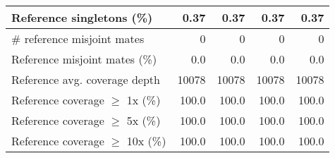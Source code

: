 \documentclass[12pt,a4paper]{article}
\begin{document}
\begin{table}[ht]
\begin{center}
\begin{tabular}{|l*{4}{|r}|}
Reference singletons (\%) & 0.37 & 0.37 & 0.37 & 0.37 \\ \hline
\# reference misjoint mates & 0 & 0 & 0 & 0 \\ \hline
Reference misjoint mates (\%) & 0.0 & 0.0 & 0.0 & 0.0 \\ \hline
Reference avg. coverage depth & 10078 & 10078 & 10078 & 10078 \\ \hline
Reference coverage $\geq$ 1x (\%) & 100.0 & 100.0 & 100.0 & 100.0 \\ \hline
Reference coverage $\geq$ 5x (\%) & 100.0 & 100.0 & 100.0 & 100.0 \\ \hline
Reference coverage $\geq$ 10x (\%) & 100.0 & 100.0 & 100.0 & 100.0 \\ \hline
\end{tabular}
\end{center}
\end{table}
\end{document}
